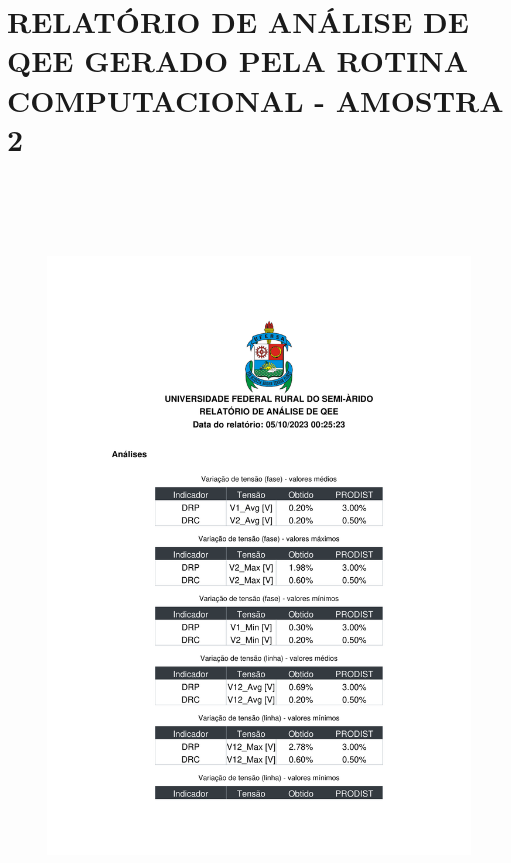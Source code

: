 \chapter{RELATÓRIO DE ANÁLISE DE QEE GERADO PELA ROTINA COMPUTACIONAL - AMOSTRA 2}
\label{ap:analise_a2}

\begin{figure}[H]
	\centering
  \includegraphics[height=20cm, page=1, clip]{contents/post_textual/analise_amostra_2.pdf}
\end{figure}

